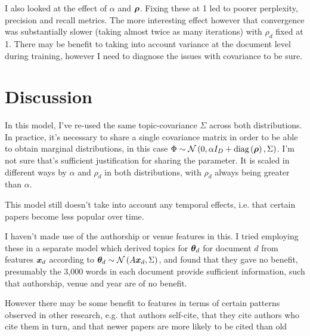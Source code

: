 I also looked at the effect of $\alpha$ and $\bm \rho$. Fixing these at 1 led to poorer perplexity, precision and recall metrics. The more interesting effect however that convergence was substantially slower (taking almost twice as many iterations) with $\rho_d$ fixed at 1. There may be benefit to taking into account variance at the document level during training, however I need to diagnose the issues with covariance to be sure. %

\section{Discussion}
In this model, I've re-used the same topic-covariance $\Sigma$ across both distributions. In practice, it's necessary to share a single covariance matrix in order to be able to obtain marginal distributions, in this case $\Phi \sim \mathcal{N} \left(0, \alpha I_D + \text{diag} \left( {\bm \rho} \right), \Sigma\right)$. I'm not sure that's sufficient justification for sharing the parameter. It is scaled in different ways by $\alpha$ and $\rho_d$ in both distributions, with $\rho_d$ always being greater than $\alpha$.

This model still doesn't take into account any temporal effects, i.e. that certain papers become less popular over time.

I haven't made use of the authorship or venue features in this. I tried employing these in a separate model which derived topics for ${ \bm \theta_d }$ for document $d$ from features ${ \bm x_d }$ according to ${ \bm \theta_d } \sim \mathcal{N} \left( {A { \bm x_d }}, {\Sigma} \right)$, and found that they gave no benefit, presumably the 3,000 words in each document provide sufficient information, such that authorship, venue and year are of no benefit. 

However there may be some benefit to features in terms of certain patterns observed in other research\cite{Bethard2010}, e.g. that authors self-cite, that they cite authors who cite them in turn, and that newer papers are more likely to be cited than old
